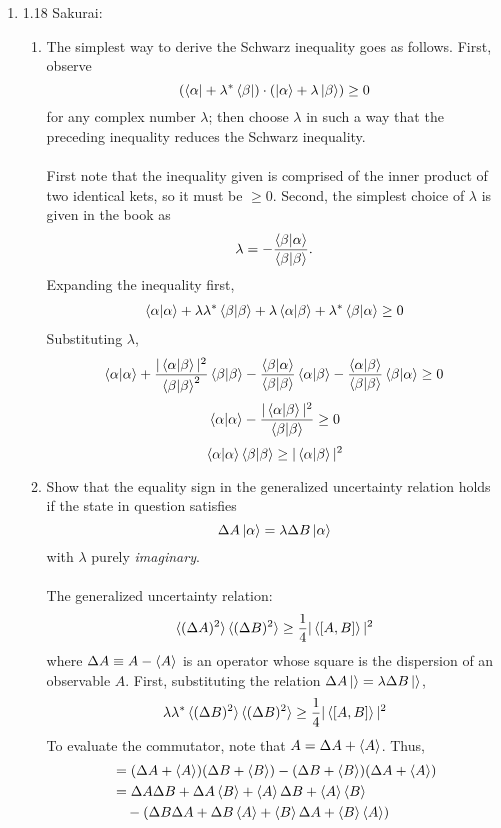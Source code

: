 \documentclass[11pt,letterpaper]{article}
\begin{document}
\begin{enumerate}
\item 1.18 Sakurai: \begin{enumerate}
\item The simplest way to derive the Schwarz inequality goes as follows. First, observe 
$$ (\bra\alpha +\lambda^*\bra\beta)\cdot(\ket\alpha+\lambda\ket\beta)\geq 0$$
for any complex number $\lambda$; then choose $\lambda$ in such a way that the preceding inequality reduces the Schwarz inequality.
\\ \\First note that the inequality given is comprised of the inner product of two identical kets, so it must be $\geq 0$. Second, the simplest choice of $\lambda$ is given in the book as
 $$\lambda = -\frac{\braket{\beta|\alpha}}{\braket{\beta|\beta}}.$$
 Expanding the inequality first,
 \begin{align*}\braket{\alpha|\alpha}+\lambda\lambda^*\braket{\beta|\beta} +\lambda\braket{\alpha|\beta}+\lambda^*\braket{\beta|\alpha} \geq 0
 \end{align*}
 Substituting $\lambda$,
$$\braket{\alpha|\alpha}+\frac{|\braket{\alpha|\beta}|^2}{\braket{\beta|\beta}^2}\braket{\beta|\beta} -\frac{\braket{\beta|\alpha}}{\braket{\beta|\beta}}\braket{\alpha|\beta}-\frac{\braket{\alpha|\beta}}{\braket{\beta|\beta}}\braket{\beta|\alpha} \geq 0$$
$$\braket{\alpha|\alpha} - \frac{|\braket{\alpha|\beta}|^2}{\braket{\beta|\beta}} \geq 0$$
$$\braket{\alpha|\alpha}\braket{\beta|\beta} \geq |\braket{\alpha|\beta}|^2$$
\item Show that the equality sign in the generalized uncertainty relation holds if the state in question satisfies
$$\Delta A \ket\alpha = \lambda \Delta B \ket\alpha$$
with $\lambda$ purely \emph{imaginary}.
\\ \\The generalized uncertainty relation:
$$\braket{(\Delta A)^2}\braket{(\Delta B)^2}\geq\frac{1}{4}|\braket{[A,B]}|^2$$
where $\Delta A \equiv A-\braket A$ is an operator whose square is the dispersion of an observable $A$. First, substituting the relation $\Delta A\ket{ } = \lambda\Delta B\ket{ }$, 
$$\lambda\lambda^*\braket{(\Delta B)^2}\braket{(\Delta B)^2} \geq \frac{1}{4}|\braket{[A,B]}|^2$$
To evaluate the commutator, note that $A = \Delta A +\braket A$. Thus,
\begin{align*}[A,B] &= (\Delta A +\braket A)(\Delta B + \braket B)-(\Delta B +\braket B)(\Delta A +\braket A)\\
&=\Delta A \Delta B + \Delta A \braket B + \braket A\Delta B+\braket A\braket B
\\&\quad -(\Delta B\Delta A +\Delta B \braket A+\braket B\Delta A +\braket B\braket A)

\end{align*}
\end{enumerate}
\end{enumerate}
\end{document}
